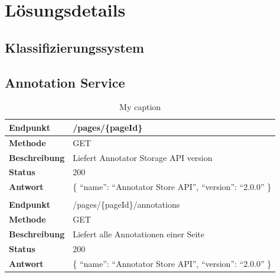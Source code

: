 \chapter{Lösungsdetails}
    \label{chapter:SolutionDetails}


    \section{Klassifizierungssystem}

    \section{Annotation Service}
        \begin{table}[htb]
            \centering
            \begin{tabular}{|l|l|}
            \hline
            \textbf{Endpunkt}     & /pages/\{pageId\}\\
            \hline
            \textbf{Methode}      & GET\\
            \hline
            \textbf{Beschreibung} & Liefert Annotator Storage API version\\
            \hline
            \textbf{Status}       & 200\\
            \hline
            \textbf{Antwort}      & \{ ``name'': ``Annotator Store API'', ``version'': ``2.0.0'' \}\\
            \hline
            & \\
            \hline
            \textbf{Endpunkt}     & /pages/\{pageId\}/annotations\\
            \hline
            \textbf{Methode}      & GET\\
            \hline
            \textbf{Beschreibung} & Liefert alle Annotationen einer Seite\\
            \hline
            \textbf{Status}       & 200\\
            \hline
            \textbf{Antwort}      & \{ ``name'': ``Annotator Store API'', ``version'': ``2.0.0'' \}\\
            \hline
            \end{tabular}
            \caption{My caption}
            \label{my-label}
        \end{table}

